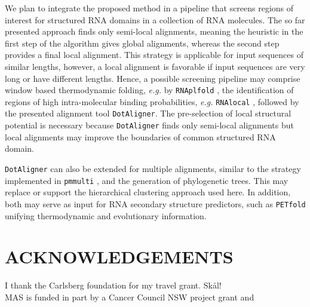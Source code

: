 \documentclass[a4paper,twoside]{article}
\newcommand\dotaligner{\texttt{DotAligner}}
\newcommand\pmmulti{\texttt{pmmulti}}
\newcommand\rnaplfold{\texttt{RNAplfold}}
\newcommand\petfold{\texttt{PETfold}}
\newcommand\rnalocal{\texttt{RNAlocal}}
\newcommand\eg{\textit{e.g.}}
\begin{document}
We plan to integrate the proposed method in a pipeline that screens
regions of interest for structured RNA domains in a collection of RNA
molecules.  The so far presented approach finds only semi-local alignments,
meaning the heuristic in the first step of the algorithm gives global
alignments, whereas the second step provides a final local alignment. This
strategy is applicable for input sequences of similar lengths, however, a
local alignment is favorable if input sequences are very long or have different
lengths.  Hence, a possible screening pipeline may comprise window based
thermodynamic folding, \eg{} by \rnaplfold{}
\cite{Bernhart:Hofacker:Stadler:Local_RNA_base:2006}, the identification of
regions of high intra-molecular binding probabilities, \eg{} \rnalocal{}
\cite{Dotu19908358}, followed by the presented alignment tool \dotaligner. The
pre-selection of local structural potential is necessary because \dotaligner{}
finds only semi-local alignments but local alignments may improve the
boundaries of common structured RNA domain. 

\dotaligner{} can also be extended for multiple alignments, similar to the strategy
implemented in \pmmulti{} \cite{Hofacker15073017}, and the generation of
phylogenetic trees. This may replace or support the hierarchical clustering
approach used here. In addition, both may serve as input for RNA secondary
structure predictors, such as \petfold{} \cite{Seemann2008} unifying
thermodynamic and evolutionary information. 


\section*{\uppercase{Acknowledgements}}

\noindent I thank the Carlsberg foundation for my travel grant. Sk\aa l! \\
MAS is funded in part by a Cancer Council NSW project grant and 



\vfill

{\small
}


\vfill
\end{document}

